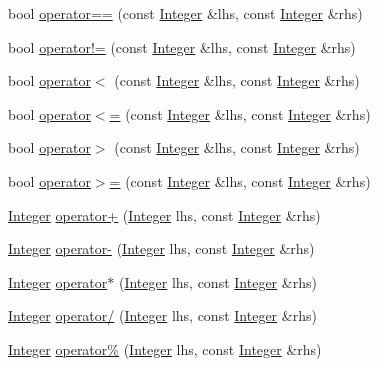 \begin{DoxyCompactItemize}
\item 
bool \hyperlink{class_integer_a01445511d8a430434af376416063d71d}{operator==} (const \hyperlink{class_integer}{Integer} \&lhs, const \hyperlink{class_integer}{Integer} \&rhs)
\item 
bool \hyperlink{class_integer_ad391df8dc93626907e924ff3fd9b1e2d}{operator!=} (const \hyperlink{class_integer}{Integer} \&lhs, const \hyperlink{class_integer}{Integer} \&rhs)
\item 
bool \hyperlink{class_integer_a1205f04dd79ca17ef200a09eb894bab4}{operator$<$} (const \hyperlink{class_integer}{Integer} \&lhs, const \hyperlink{class_integer}{Integer} \&rhs)
\item 
bool \hyperlink{class_integer_a730ae17a06ce6ea59504868598d061dd}{operator$<$=} (const \hyperlink{class_integer}{Integer} \&lhs, const \hyperlink{class_integer}{Integer} \&rhs)
\item 
bool \hyperlink{class_integer_a0007c8d2187897b1e1675677bf432146}{operator$>$} (const \hyperlink{class_integer}{Integer} \&lhs, const \hyperlink{class_integer}{Integer} \&rhs)
\item 
bool \hyperlink{class_integer_afad00c6a35103e4597423c97c25c4ae9}{operator$>$=} (const \hyperlink{class_integer}{Integer} \&lhs, const \hyperlink{class_integer}{Integer} \&rhs)
\item 
\hyperlink{class_integer}{Integer} \hyperlink{class_integer_a8a111f64cebbf58268d9b60f93d5e542}{operator+} (\hyperlink{class_integer}{Integer} lhs, const \hyperlink{class_integer}{Integer} \&rhs)
\item 
\hyperlink{class_integer}{Integer} \hyperlink{class_integer_a42aae7e62188ee2db3daf01b2888a1f2}{operator-\/} (\hyperlink{class_integer}{Integer} lhs, const \hyperlink{class_integer}{Integer} \&rhs)
\item 
\hyperlink{class_integer}{Integer} \hyperlink{class_integer_a48386930c1e622d19df197393f6be01a}{operator$\ast$} (\hyperlink{class_integer}{Integer} lhs, const \hyperlink{class_integer}{Integer} \&rhs)
\item 
\hyperlink{class_integer}{Integer} \hyperlink{class_integer_aeaafaff40a58b3724192ef0e759788b5}{operator/} (\hyperlink{class_integer}{Integer} lhs, const \hyperlink{class_integer}{Integer} \&rhs)
\item 
\hyperlink{class_integer}{Integer} \hyperlink{class_integer_aea18c4ff2ec0c30ed29a4010e892d385}{operator\%} (\hyperlink{class_integer}{Integer} lhs, const \hyperlink{class_integer}{Integer} \&rhs)

\end{DoxyCompactItemize}
